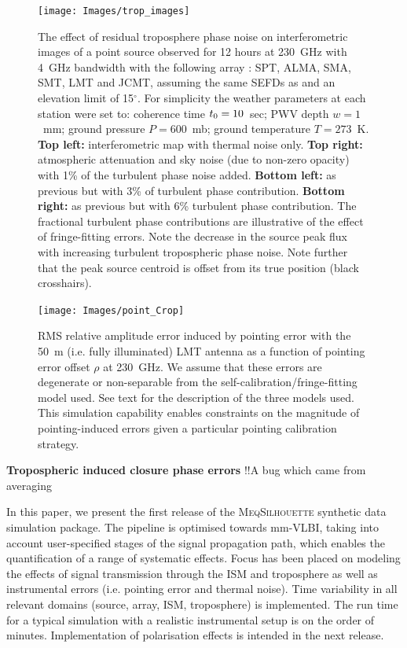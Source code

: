 \begin{figure}
\begin{center}
\texttt{[image: Images/trop\_images]}
\caption{The effect of residual troposphere phase noise on interferometric images of a point source observed for 12 hours at 230~GHz with 4~GHz bandwidth with the following array : SPT, ALMA, SMA, SMT, LMT and JCMT, assuming the same SEFDs as \protect\citet{Lu_2014} and an elevation limit of 15$^\circ$. For simplicity the weather parameters at each station were set to: coherence time $t_{\rm 0}=10$~sec; PWV depth $w=1$~mm; ground pressure $P=600$~mb; ground temperature $T =273$~K. {\bf Top left:} interferometric map with thermal noise only. {\bf Top right:} atmospheric attenuation and sky noise (due to non-zero opacity) with 1\% of the turbulent phase noise added. {\bf Bottom left:} as previous but with 3\% of turbulent phase contribution. {\bf Bottom right:} as previous but with 6\% turbulent phase contribution. The fractional turbulent phase contributions are illustrative of the effect of fringe-fitting errors. Note the decrease in the source peak flux with increasing turbulent tropospheric phase noise. Note further that the peak source centroid is offset from its true position (black crosshairs). \label{fig:trop_images}%
}
\end{center}
\end{figure}


\begin{figure}
\begin{center}
\texttt{[image: Images/point\_Crop]}
\caption{RMS relative amplitude error induced by pointing error with the 50~m (i.e. fully illuminated) LMT antenna as a function of pointing error offset $\rho$ at 230~GHz. We assume that these errors are degenerate or non-separable from the self-calibration/fringe-fitting model used. See text for the description of the three models used. This simulation capability enables constraints on the magnitude of pointing-induced errors given a particular pointing calibration strategy.\label{fig:pointing}%
}
\end{center}
\end{figure}


{\bf Tropospheric induced closure phase errors}
!!A bug which came from averaging
 
 
In this paper, we present the first release of the \textsc{MeqSilhouette} synthetic data simulation package. The pipeline is optimised towards mm-VLBI, taking into account user-specified stages of the signal propagation path, which enables the quantification of a range of systematic effects. Focus has been placed on modeling the effects of signal transmission through the ISM and troposphere as well as instrumental errors (i.e. pointing error and thermal noise). Time variability in all relevant domains (source, array, ISM, troposphere) is implemented. The run time for a typical simulation with a realistic instrumental setup is on the order of minutes.  Implementation of polarisation effects is intended in the next release. 


